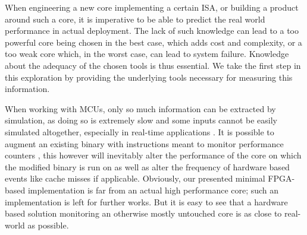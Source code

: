 \documentclass[../bachelor_paper.tex]{subfiles}
\begin{document}
When engineering a new core implementing a certain \ac{ISA}, or building a product around such a core, it is imperative to be able to predict the real world performance in actual deployment. The lack of such knowledge can lead to a too powerful core being chosen in the best case, which adds cost and complexity, or a too weak core which, in the worst case, can lead to system failure. Knowledge about the adequacy of the chosen tools is thus essential. We take the first step in this exploration by providing the underlying tools necessary for measuring this information.

When working with \acp{MCU}, only so much information can be extracted by simulation, as doing so is extremely slow \cite{eeckhoutDesigningComputerArchitecture2003,kaoHardwareApproachRealTime2007} and some inputs cannot be easily simulated altogether, especially in real-time applications \cite{kaoHardwareApproachRealTime2007}. It is possible to augment an existing binary with instructions meant to monitor performance counters \cite{eeckhoutQuantifyingImpactInput2003}, this however will inevitably alter the performance of the core on which the modified binary is run on as well as alter the frequency of hardware based events like cache misses if applicable. Obviously, our presented minimal FPGA-based implementation is far from an actual high performance core; such an implementation is left for further works. But it is easy to see that a hardware based solution monitoring an otherwise mostly untouched core is as close to real-world as possible.
\end{document}
